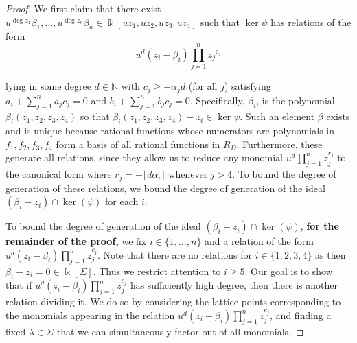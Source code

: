\documentclass{amsart}
\theoremstyle{plain}
\theoremstyle{definition}
\theoremstyle{remark}
\numberwithin{equation}{section}
\newcommand\bz{{\mathbb Z}}
\newcommand\bk{{\Bbbk}}
\newcommand\bida{a}
\newcommand\bidb{b}
\begin{document}
\begin{proof}
We first claim that there exist $u^{\deg z_1}\beta_1, \ldots, u^{\deg z_n} \beta_n\in \bk[uz_1, uz_2, uz_3, uz_4]$
such that $\ker \psi$ has relations of the form
\begin{equation}
\label{eqn:hirz-relations-psi}
	u^d(z_i - \beta_i)\prod_{j=1}^n {z_j}^{c_{j}}
\end{equation}

\noindent
lying in some degree $d \in \mathbb{N}$
with $c_j \ge -\alpha_j d$ (for all $j$) satisfying $\bida_i + \sum_{j = 1}
^n \bida_j c_j = 0$ and $\bidb_i + \sum_{j=1}^n \bidb_j c_j = 0$.
Specifically, $\beta_i$,
is the polynomial $\beta_i(z_1,z_2,z_3,z_4)$ so that
$\beta_i(z_1,z_2,z_3,z_4) - z_i \in \ker \psi$. Such an element
$\beta$ exists and is unique because rational functions
whose numerators are polynomials in $f_1,f_2,f_3,f_4$ form a basis
of all rational functions in $R_D$. Furthermore, these
generate all relations, since they allow us to reduce any monomial $u^d\prod_{j =
1}^n z_j^{r_j}$ to the canonical form where $r_j = - \lfloor d \alpha_i
\rfloor$
whenever $j > 4$.  To bound the degree of generation of these relations, we bound the degree of generation of the ideal $(\beta_i  -z_i) \cap \ker(\psi)$ for each $i$.

To bound the degree of generation of the ideal 
$(\beta_i - z_i) \cap \ker(\psi)$, {\bf for the remainder of the proof,} we fix $i \in \{1,\ldots, n\}$ and a relation of 
the form $u^d(z_i - \beta_i)\prod_{j=1}^n z_j^{c_j}.$ Note that there 
are no relations for $i\in \{1, 2, 3, 4\}$ as then $\beta_i - z_i = 0 \in \bk[\Sigma]$. Thus we restrict attention to $i \ge 5$. Our goal 
is to show that if $u^d(z_i - \beta_i)\prod_{j=1}^n z_j^{c_j}$ has 
sufficiently high degree, then there is another relation dividing it. 
We do so by considering the lattice points corresponding to the 
monomials appearing in the relation $u^d(z_i - \beta_i)\prod_{j=1}^n z_j^{c_j}$, and finding a fixed $\lambda\in \Sigma$
that we can simultaneously factor out of all monomials.



\end{proof}
\end{document}
